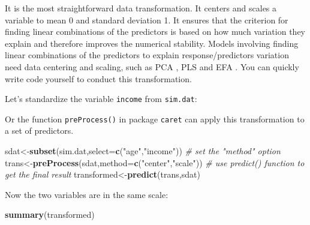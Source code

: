 \documentclass[12pt,]{krantz}
\newenvironment{Shaded}{\begin{snugshade}}{\end{snugshade}}
\newcommand{\KeywordTok}[1]{\textcolor[rgb]{0.13,0.29,0.53}{\textbf{{#1}}}}
\newcommand{\DataTypeTok}[1]{\textcolor[rgb]{0.13,0.29,0.53}{{#1}}}
\newcommand{\StringTok}[1]{\textcolor[rgb]{0.31,0.60,0.02}{{#1}}}
\newcommand{\CommentTok}[1]{\textcolor[rgb]{0.56,0.35,0.01}{\textit{{#1}}}}
\newcommand{\NormalTok}[1]{{#1}}
\theoremstyle{definition}
\theoremstyle{definition}
\theoremstyle{remark}
\begin{document}
It is the most straightforward data transformation. It centers and
scales a variable to mean 0 and standard deviation 1. It ensures that
the criterion for finding linear combinations of the predictors is based
on how much variation they explain and therefore improves the numerical
stability. Models involving finding linear combinations of the
predictors to explain response/predictors variation need data centering
and scaling, such as PCA \citep{pca1}, PLS \citep{PLS1} and EFA
\citep{EFA1}. You can quickly write code yourself to conduct this
transformation.

Let's standardize the variable \texttt{income} from \texttt{sim.dat}:

\begin{Shaded}
\end{Shaded}

Or the function \texttt{preProcess()} in package \texttt{caret} can
apply this transformation to a set of predictors.

\begin{Shaded}
\begin{Highlighting}[]
\NormalTok{sdat<-}\KeywordTok{subset}\NormalTok{(sim.dat,}\DataTypeTok{select=}\KeywordTok{c}\NormalTok{(}\StringTok{"age"}\NormalTok{,}\StringTok{"income"}\NormalTok{))}
\CommentTok{# set the "method" option}
\NormalTok{trans<-}\KeywordTok{preProcess}\NormalTok{(sdat,}\DataTypeTok{method=}\KeywordTok{c}\NormalTok{(}\StringTok{"center"}\NormalTok{,}\StringTok{"scale"}\NormalTok{))}
\CommentTok{# use predict() function to get the final result}
\NormalTok{transformed<-}\KeywordTok{predict}\NormalTok{(trans,sdat)}
\end{Highlighting}
\end{Shaded}

Now the two variables are in the same scale:

\begin{Shaded}
\begin{Highlighting}[]
\KeywordTok{summary}\NormalTok{(transformed)}
\end{Highlighting}
\end{Shaded}
\end{document}
